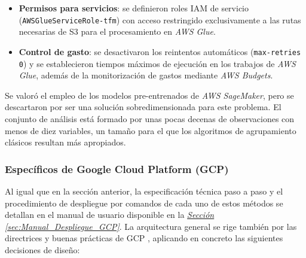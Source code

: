 \begin{enumerate}
\begin{itemize}
		\item \textbf{Permisos para servicios}: se definieron roles IAM de servicio (\texttt{AWSGlueServiceRole-tfm}) con acceso restringido exclusivamente a las rutas necesarias de S3 para el procesamiento en \textit{AWS Glue}.
		\item \textbf{Control de gasto}: se desactivaron los reintentos automáticos (\texttt{max-retries 0}) y se establecieron tiempos máximos de ejecución en los trabajos de \textit{AWS Glue}, además de la monitorización de gastos mediante \textit{AWS Budgets}.
	\end{itemize}
\end{enumerate}

Se valoró el empleo de los modelos pre-entrenados de \textit{AWS SageMaker}, pero se descartaron por ser una solución sobredimensionada para este problema. El conjunto de análisis está formado por unas pocas decenas de observaciones con menos de diez variables, un tamaño para el que los algoritmos de agrupamiento clásicos resultan más apropiados.

\subsubsection{Específicos de Google Cloud Platform (GCP)}

Al igual que en la sección anterior, la especificación técnica paso a paso y el procedimiento de despliegue por comandos de cada uno de estos métodos se detallan en el manual de usuario disponible en la \hyperref[sec:Manual_Despliegue_GCP]{\textit{Sección \ref*{sec:Manual_Despliegue_GCP}}}. La arquitectura general se rige también por las directrices y buenas prácticas de GCP \citep{GCPArchitectureFramework2026}, aplicando en concreto las siguientes decisiones de diseño:

